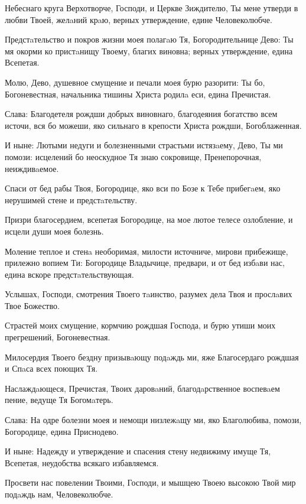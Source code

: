 

Небеснаго круга Верхотворче, Господи, и Церкве Зиждителю, Ты мене утверди в любви Твоей, желaний крaю, верных утверждение, едине Человеколюбче.

Предстaтельство и покров жизни моея полагaю Тя, Богородительнице Дево: Ты мя окорми ко пристaнищу Твоему, благих виновна; верных утверждение, едина Всепетая.


Молю, Дево, душевное смущение и печали моея бурю разорити: Ты бо, Богоневестная, начальника тишины Христа родилa еси, едина Пречистая.


Слава: Благодетеля рождши добрых виновнаго, благодеяния богатство всем источи, вся бо можеши, яко сильнаго в крепости Христа рождши, Богоблаженная.


И ныне: Лютыми недуги и болезненными страстьми истязaему, Дево, Ты ми помози: исцелений бо неоскудное Тя знаю сокровище, Пренепорочная, неиждивaемое.


Спаси от бед рабы Твоя, Богородице, яко вси по Бозе к Тебе прибегaем, яко нерушимей стене и предстaтельству.


Призри благосердием, всепетая Богородице, на мое лютое телесе озлобление, и исцели души моея болезнь.




Моление теплое и стенa необоримая, милости источниче, мирови прибежище, прилежно вопием Ти: Богородице Владычице, предвари, и от бед избaви нас, едина вскоре предстaтельствующая.




Услышах, Господи, смотрения Твоего тaинство, разумех дела Твоя и прослaвих Твое Божество.

Страстей моих смущение, кормчию рождшая Господа, и бурю утиши моих прегрешений, Богоневестная.


Милосердия Твоего бездну призывaющу подaждь ми, яже Благосердаго рождшая и Спaса всех поющих Тя.


Наслаждaющеся, Пречистая, Твоих даровaний, благодaрственное воспевaем пение, ведуще Тя Богомaтерь.


Слава: На одре болезни моея и немощи низлежaщу ми, яко Благолюбива, помози, Богородице, едина Приснодево.


И ныне: Надежду и утверждение и спасения стену недвижиму имуще Тя, Всепетая, неудобства всякаго избавляемся.




Просвети нас повелении Твоими, Господи, и мышцею Твоею высокою Твой мир подaждь нам, Человеколюбче.

